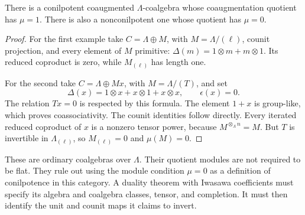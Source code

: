 \begin{proposition}\label{v4-arith:coefficients:prop:mu}
There is a conilpotent coaugmented \(\Lambda\)-coalgebra whose
coaugmentation quotient has \(\mu=1\). There is also a
nonconilpotent one whose quotient has \(\mu=0\).
\end{proposition}
\begin{proof}
For the first example take
\(C=\Lambda\oplus M\), with \(M=\Lambda/(\ell)\), counit
projection, and every element of \(M\) primitive:
\(\Delta(m)=1\otimes m+m\otimes1\). Its reduced coproduct is
zero, while \(M_{(\ell)}\) has length one.

For the second take \(C=\Lambda\oplus Mx\), with
\(M=\Lambda/(T)\), and set
\[
 \Delta(x)=1\otimes x+x\otimes1+x\otimes x,
 \qquad \epsilon(x)=0.
\]
The relation \(Tx=0\) is respected by this formula.
The element \(1+x\) is group-like, which proves coassociativity.
The counit identities follow directly. Every iterated reduced
coproduct of \(x\) is a nonzero tensor power, because
\(M^{\otimes_\Lambda n}=M\). But \(T\) is invertible in
\(\Lambda_{(\ell)}\), so \(M_{(\ell)}=0\) and \(\mu(M)=0\).
\end{proof}

These are ordinary coalgebras over \(\Lambda\). Their quotient
modules are not required to be flat. They rule out using the module
condition \(\mu=0\) as a definition of conilpotence in this category.
A duality theorem with Iwasawa coefficients must specify its algebra
and coalgebra classes, tensor, and completion. It must then identify
the unit and counit maps it claims to invert.
